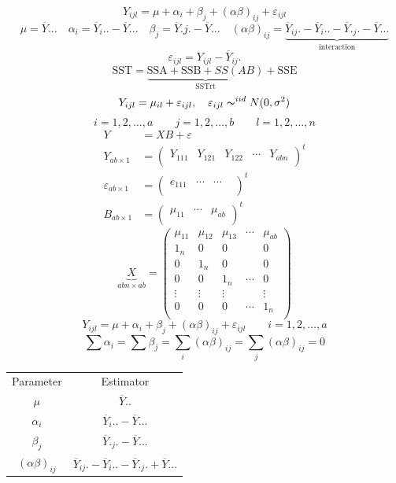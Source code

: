 \documentclass[11pt,a4paper]{article}
\theoremstyle{definition}
\begin{document}
$$Y_{ijl} = \mu + \alpha_i +\beta_j + (\alpha\beta)_{ij} + \varepsilon_{ijl}$$
$$\mu = \overline{Y}... \quad  \alpha_i=\overline{Y}_i..-\overline{Y}... \quad \beta_j= \overline{Y}.j.-\overline{Y}...\quad  (\alpha\beta)_{ij}= \underbrace{\overline{Y}_{ij}.-\overline{Y}_i..-\overline{Y}._j.-\overline{Y}...}_{\text{interaction}}$$
$$\varepsilon_{ijl}=Y_{ijl}-\overline{Y}_{ij}.$$
$$\text{SST} = \underbrace{\text{SSA} + \text{SSB} + SS(AB)}_{\text{SSTrt}}+ \text{SSE}$$
$$Y_{ijl} = \mu_{il}+\varepsilon_{ijl},\quad  \varepsilon_{ijl}\thicksim^{iid}N(0,\sigma^2)$$ $$i=1,2,\ldots , a\qquad  j=1,2,\ldots ,b\qquad  l=1,2,\ldots , n$$
\begin{align*}
Y & = XB +\varepsilon\\
Y_{ab\times 1} & = 
\begin{pmatrix}
Y_{111} & Y_{121} & Y_{122} & \cdots & Y_{abn}\\ 
\end{pmatrix}^t\\
\varepsilon_{ab\times 1} & = 
\begin{pmatrix}
e_{111}& \cdots & \cdots & \\
\end{pmatrix}^t\\
B_{ab\times 1} & = 
\begin{pmatrix}
\mu_{11} & \cdots & \mu_{ab}\\
\end{pmatrix}^t
\end{align*}
$$\underbrace{X}_{abn\times ab}=
\begin{pmatrix}
\mu_{11} & \mu_{12} & \mu_{13} & \cdots & \mu_{ab}\\
1_n & 0 & 0 &   & 0\\
0   & 1_n & 0 &  & 0\\
0   &   0 & 1_n &\cdots & 0\\
\vdots & \vdots & \vdots & &\vdots\\
0 & 0 & 0 & \cdots & 1_n\\
\end{pmatrix}
$$
$$Y_{ijl}=\mu + \alpha_i + \beta_j + (\alpha \beta)_{ij} + \varepsilon_{ijl}\qquad  i=1,2,\ldots ,a$$
$$\sum \alpha_i=\sum \beta_j =\sum_i (\alpha\beta)_{ij}=\sum_j(\alpha\beta)_{ij}=0$$


\begin{table}[h!]
\centering
\begin{tabular}{cc}
Parameter & Estimator\\
$\mu$ & $\overline{Y}..$\\
$\alpha_i$ & $\overline{Y}_i..-\overline{Y}...$\\
$\beta_j$ & $\overline{Y}._j.-\overline{Y}...$\\
$(\alpha\beta)_{ij}$ & $\overline{Y}_{ij}.-\overline{Y}_i..-\overline{Y}._j.+\overline{Y}...$\\
\end{tabular}
\end{table}
\end{document}
